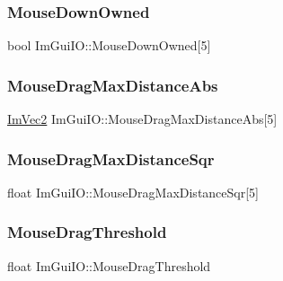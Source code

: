 \hypertarget{struct_im_gui_i_o_a682f98d817f99058136cb47cf8a9bcc3}{}\label{struct_im_gui_i_o_a682f98d817f99058136cb47cf8a9bcc3} 
\subsubsection{\texorpdfstring{Mouse\+Down\+Owned}{MouseDownOwned}}
{\footnotesize\ttfamily bool Im\+Gui\+I\+O\+::\+Mouse\+Down\+Owned\mbox{[}5\mbox{]}}

\hypertarget{struct_im_gui_i_o_a402bca8838011fc4518c0895f24ffc92}{}\label{struct_im_gui_i_o_a402bca8838011fc4518c0895f24ffc92} 
\subsubsection{\texorpdfstring{Mouse\+Drag\+Max\+Distance\+Abs}{MouseDragMaxDistanceAbs}}
{\footnotesize\ttfamily \hyperlink{struct_im_vec2}{Im\+Vec2} Im\+Gui\+I\+O\+::\+Mouse\+Drag\+Max\+Distance\+Abs\mbox{[}5\mbox{]}}

\hypertarget{struct_im_gui_i_o_a86c7fe77349fd82a60ab7a279aa27f01}{}\label{struct_im_gui_i_o_a86c7fe77349fd82a60ab7a279aa27f01} 
\subsubsection{\texorpdfstring{Mouse\+Drag\+Max\+Distance\+Sqr}{MouseDragMaxDistanceSqr}}
{\footnotesize\ttfamily float Im\+Gui\+I\+O\+::\+Mouse\+Drag\+Max\+Distance\+Sqr\mbox{[}5\mbox{]}}

\hypertarget{struct_im_gui_i_o_ad8b9a9924b0d6bde6a0fa35c17aa54ae}{}\label{struct_im_gui_i_o_ad8b9a9924b0d6bde6a0fa35c17aa54ae} 
\subsubsection{\texorpdfstring{Mouse\+Drag\+Threshold}{MouseDragThreshold}}
{\footnotesize\ttfamily float Im\+Gui\+I\+O\+::\+Mouse\+Drag\+Threshold}

